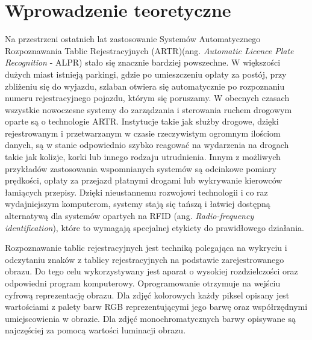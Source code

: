%


\chapter{Wprowadzenie teoretyczne}

Na przestrzeni ostatnich lat zastosowanie Systemów Automatycznego Rozpoznawania Tablic Rejestracyjnych (ARTR)(ang. \textit{Automatic Licence Plate Recognition} - ALPR) stało się znacznie bardziej powszechne.
W większości dużych miast istnieją parkingi, gdzie po umieszczeniu opłaty za postój, przy zbliżeniu się do wyjazdu, szlaban otwiera się automatycznie po rozpoznaniu numeru rejestracyjnego pojazdu, którym się poruszamy.
W obecnych czasach wszystkie nowoczesne systemy do zarządzania i sterowania ruchem drogowym oparte są o technologie ARTR.
Instytucje takie jak służby drogowe, dzięki rejestrowanym i przetwarzanym w czasie rzeczywistym ogromnym ilościom danych, są w stanie odpowiednio szybko reagować na wydarzenia na drogach takie jak kolizje, korki lub innego rodzaju utrudnienia.
Innym z możliwych przykładów zastosowania wspomnianych systemów są odcinkowe pomiary prędkości, opłaty za przejazd płatnymi drogami lub wykrywanie kierowców łamiących przepisy.
Dzięki nieustannemu rozwojowi technologii i co raz wydajniejszym komputerom, systemy stają się tańszą i łatwiej dostępną alternatywą dla systemów opartych na RFID (ang. \textit{Radio-frequency identification}), które to wymagają specjalnej etykiety do prawidłowego działania.

Rozpoznawanie tablic rejestracyjnych jest techniką polegająca na wykryciu i odczytaniu znaków z tablicy rejestracyjnych na podstawie zarejestrowanego obrazu.
Do tego celu wykorzystywany jest aparat o wysokiej rozdzielczości oraz odpowiedni program komputerowy.
Oprogramowanie otrzymuje na wejściu cyfrową reprezentację obrazu.
Dla zdjęć kolorowych każdy piksel opisany jest wartościami z palety barw RGB reprezentującymi jego barwę oraz współrzędnymi umiejscowienia w obrazie.
Dla zdjęć monochromatycznych barwy opisywane są najczęściej za pomocą wartości luminacji obrazu.

